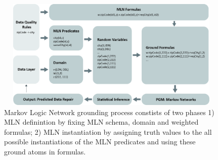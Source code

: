 \begin{figure}[t]
 \centering
 \includegraphics[width=450px, height=200px]{img/mlogic-grounging.jpg}
 \caption{Markov Logic Network grounding process constists of two phases 1) MLN definintion by fixing MLN schema, domain and weighted formulas; 2) MLN instantiation by assigning truth values to the all possible instantiations of the MLN predicates and using these ground atoms in formulas.}
 \label{fig:mlngrounding}
\end{figure}

